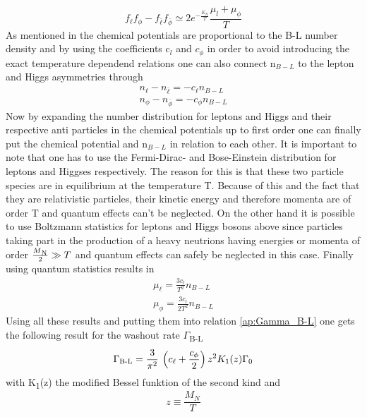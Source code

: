 \begin{equation}
	f_\ell f_\phi-f_{\bar{\ell}}f_{\bar{\phi}}\simeq 2e^{-\frac{E_N}{T}}\frac{\mu_l+\mu_\phi}{T}
	\label{eq:distri_diff}
\end{equation}
As mentioned in \cite[p. 7]{Bodeker:2013qaa} the chemical potentials are proportional to the B-L number density and by using the coefficients c$_l$ and $c_\phi$ in order to avoid introducing the exact temperature dependend relations one can also connect n$_{B-L}$ to the lepton and Higgs asymmetries through \cite[p. 7]{Bodeker:2013qaa}
\begin{align}
	n_\ell-n_{\bar{\ell}}=-c_\ell n_{B-L}
	\label{eq:l-lbar} \\
	n_\phi-n_{\bar{\phi}}=-c_\phi n_{B-L}
	\label{eq:phi-phibar}
\end{align}
Now by expanding the number distribution for leptons and Higgs and their respective anti particles in the chemical potentials up to first order one can finally put the chemical potential and n$_{B-L}$ in relation to each other. It is important to note that one has to use the Fermi-Dirac- and Bose-Einstein distribution for leptons and Higgses respectively. The reason for this is that these two particle species are in equilibrium at the temperature T. Because of this and the fact that they are relativistic particles, their kinetic energy and therefore momenta are of order T and quantum effects can't be neglected. On the other hand it is possible to use Boltzmann statistics for leptons and Higgs bosons above since particles taking part in the production of a heavy neutrions having energies or momenta of order $\frac{M\textsubscript{N}}{2}\gg T$ and quantum effects can safely be neglected in this case. Finally using quantum statistics results in
\begin{align}
\mu_\ell=\frac{3c_l}{T^2}n_{B-L}
\label{eq:chempot_l}
\\
\mu_\phi=\frac{3c_l}{2T^2}n_{B-L}
\label{eq:chempot_phi}
\end{align}
Using all these results and putting them into relation \ref{ap:Gamma_B-L} one gets the following result for the washout rate $\Gamma$\textsubscript{B-L}
\begin{equation}
	\Gamma\textsubscript{B-L}=\frac{3}{\pi^2}\:\left(c_\ell+\frac{c_\phi}{2}\right)z^2K_1(z)\Gamma_0
	\label{eq:Gamma_B-l_result}
\end{equation}
with K\textsubscript{1}(z) the modified Bessel funktion of the second kind and 
\begin{equation}
	z\equiv\frac{M_N}{T}
\end{equation}
